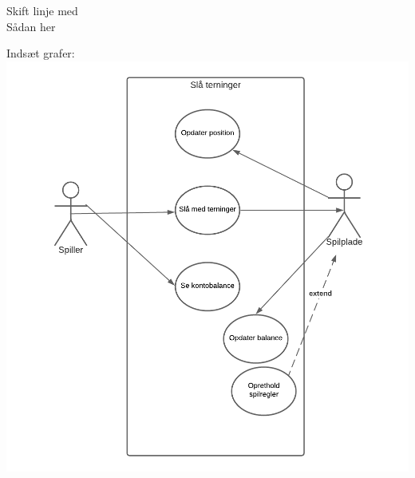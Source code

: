 \begin{flushleft} %

Skift linje med \\
Sådan her \\

\addlinespace %

Indsæt grafer:
\includegraphics[width=1\textwidth]{Report/figures/Use case diagram CDIO del3.png}~\\[1cm]

\end{flushleft}